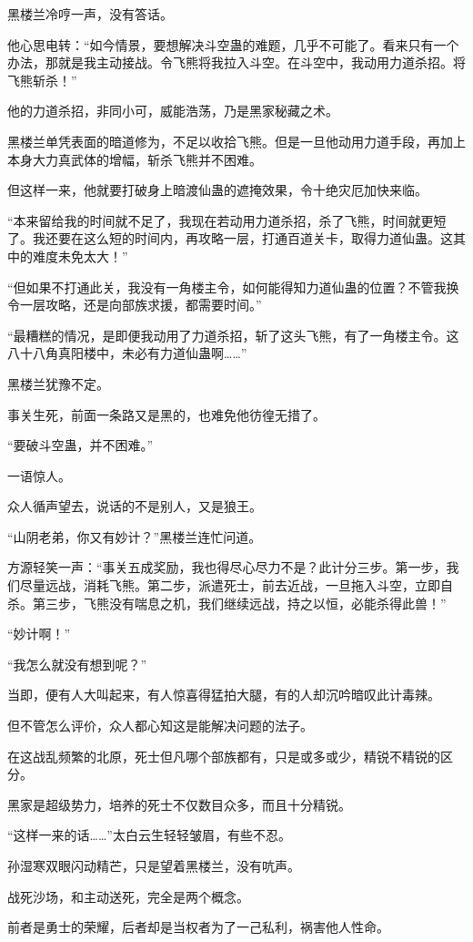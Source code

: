 \begin{this_body}
黑楼兰冷哼一声，没有答话。

他心思电转：“如今情景，要想解决斗空蛊的难题，几乎不可能了。看来只有一个办法，那就是我主动接战。令飞熊将我拉入斗空。在斗空中，我动用力道杀招。将飞熊斩杀！”

他的力道杀招，非同小可，威能浩荡，乃是黑家秘藏之术。

黑楼兰单凭表面的暗道修为，不足以收拾飞熊。但是一旦他动用力道手段，再加上本身大力真武体的增幅，斩杀飞熊并不困难。

但这样一来，他就要打破身上暗渡仙蛊的遮掩效果，令十绝灾厄加快来临。

“本来留给我的时间就不足了，我现在若动用力道杀招，杀了飞熊，时间就更短了。我还要在这么短的时间内，再攻略一层，打通百道关卡，取得力道仙蛊。这其中的难度未免太大！”

“但如果不打通此关，我没有一角楼主令，如何能得知力道仙蛊的位置？不管我换令一层攻略，还是向部族求援，都需要时间。”

“最糟糕的情况，是即便我动用了力道杀招，斩了这头飞熊，有了一角楼主令。这八十八角真阳楼中，未必有力道仙蛊啊……”

黑楼兰犹豫不定。

事关生死，前面一条路又是黑的，也难免他彷徨无措了。

“要破斗空蛊，并不困难。”

一语惊人。

众人循声望去，说话的不是别人，又是狼王。

“山阴老弟，你又有妙计？”黑楼兰连忙问道。

方源轻笑一声：“事关五成奖励，我也得尽心尽力不是？此计分三步。第一步，我们尽量远战，消耗飞熊。第二步，派遣死士，前去近战，一旦拖入斗空，立即自杀。第三步，飞熊没有喘息之机，我们继续远战，持之以恒，必能杀得此兽！”

“妙计啊！”

“我怎么就没有想到呢？”

当即，便有人大叫起来，有人惊喜得猛拍大腿，有的人却沉吟暗叹此计毒辣。

但不管怎么评价，众人都心知这是能解决问题的法子。

在这战乱频繁的北原，死士但凡哪个部族都有，只是或多或少，精锐不精锐的区分。

黑家是超级势力，培养的死士不仅数目众多，而且十分精锐。

“这样一来的话……”太白云生轻轻皱眉，有些不忍。

孙湿寒双眼闪动精芒，只是望着黑楼兰，没有吭声。

战死沙场，和主动送死，完全是两个概念。

前者是勇士的荣耀，后者却是当权者为了一己私利，祸害他人性命。


\end{this_body}
